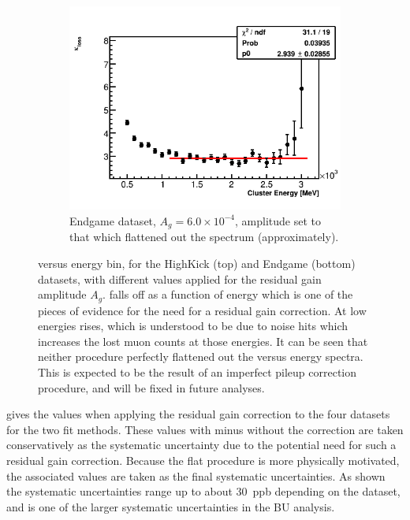 \begin{landscape}
\begin{figure}[h]
    \hspace{1cm}
    \begin{subfigure}[t]{0.34\textwidth}
        \centering
        \includegraphics[width=\textwidth]{TMethod_kappa_loss_Vs_EBin_Canv_EG-6p0}
        \caption{Endgame dataset, $A_{g} = 6.0 \times 10^{-4}$, amplitude set to that which flattened out the \K spectrum (approximately).}
    \end{subfigure}
\caption[]{\K versus energy bin, for the HighKick (top) and Endgame (bottom) datasets, with different values applied for the residual gain amplitude $A_{g}$. \K falls off as a function of energy which is one of the pieces of evidence for the need for a residual gain correction. At low energies \K rises, which is understood to be due to noise hits which increases the lost muon counts at those energies. It can be seen that neither procedure perfectly flattened out the \K versus energy spectra. This is expected to be the result of an imperfect pileup correction procedure, and will be fixed in future analyses.}
\label{fig:EBinKloss}
\end{figure}
\end{landscape}







 gives the \DR values when applying the residual gain correction to the four datasets for the two fit methods. These \DR values with minus without the correction are taken conservatively as the systematic uncertainty due to the potential need for such a residual gain correction. Because the flat \K procedure is more physically motivated, the associated values are taken as the final systematic uncertainties. As shown the systematic uncertainties range up to about 30~ppb depending on the dataset, and is one of the larger systematic uncertainties in the BU analysis.


